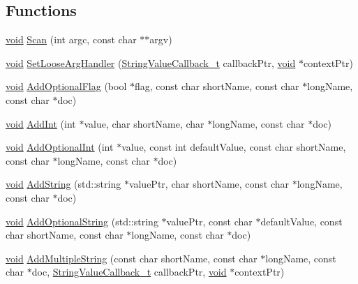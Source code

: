 \subsection*{Functions}
\begin{DoxyCompactItemize}
\item 
\hyperlink{_t_e_m_p_l_a_t_e__cdef_8h_ac9c84fa68bbad002983e35ce3663c686}{void} \hyperlink{namespaceargs_aaa94887be475da49f06e7b539f2ee8b2}{Scan} (int argc, const char $\ast$$\ast$argv)
\item 
\hyperlink{_t_e_m_p_l_a_t_e__cdef_8h_ac9c84fa68bbad002983e35ce3663c686}{void} \hyperlink{namespaceargs_a7a76d0392a64edfae4a1f918ceaebd53}{Set\+Loose\+Arg\+Handler} (\hyperlink{namespaceargs_a80ec8961b6c497068858afd698ac71cb}{String\+Value\+Callback\+\_\+t} callback\+Ptr, \hyperlink{_t_e_m_p_l_a_t_e__cdef_8h_ac9c84fa68bbad002983e35ce3663c686}{void} $\ast$context\+Ptr)
\item 
\hyperlink{_t_e_m_p_l_a_t_e__cdef_8h_ac9c84fa68bbad002983e35ce3663c686}{void} \hyperlink{namespaceargs_ad246cd5717a600f256fe3d3dbb4dcba9}{Add\+Optional\+Flag} (bool $\ast$flag, const char short\+Name, const char $\ast$long\+Name, const char $\ast$doc)
\item 
\hyperlink{_t_e_m_p_l_a_t_e__cdef_8h_ac9c84fa68bbad002983e35ce3663c686}{void} \hyperlink{namespaceargs_a8ce5e23940dc6bd4f3930a3b38d4ead5}{Add\+Int} (int $\ast$value, char short\+Name, char $\ast$long\+Name, const char $\ast$doc)
\item 
\hyperlink{_t_e_m_p_l_a_t_e__cdef_8h_ac9c84fa68bbad002983e35ce3663c686}{void} \hyperlink{namespaceargs_ae5253c9235c9ef665c69a7ab05134625}{Add\+Optional\+Int} (int $\ast$value, const int default\+Value, const char short\+Name, const char $\ast$long\+Name, const char $\ast$doc)
\item 
\hyperlink{_t_e_m_p_l_a_t_e__cdef_8h_ac9c84fa68bbad002983e35ce3663c686}{void} \hyperlink{namespaceargs_a636279358f729c080829ff89179f214c}{Add\+String} (std\+::string $\ast$value\+Ptr, char short\+Name, const char $\ast$long\+Name, const char $\ast$doc)
\item 
\hyperlink{_t_e_m_p_l_a_t_e__cdef_8h_ac9c84fa68bbad002983e35ce3663c686}{void} \hyperlink{namespaceargs_a5a4037678fe472776c6270bbd2f6f827}{Add\+Optional\+String} (std\+::string $\ast$value\+Ptr, const char $\ast$default\+Value, const char short\+Name, const char $\ast$long\+Name, const char $\ast$doc)
\item 
\hyperlink{_t_e_m_p_l_a_t_e__cdef_8h_ac9c84fa68bbad002983e35ce3663c686}{void} \hyperlink{namespaceargs_a3c197cf8b548389b00021f74b02c4491}{Add\+Multiple\+String} (const char short\+Name, const char $\ast$long\+Name, const char $\ast$doc, \hyperlink{namespaceargs_a80ec8961b6c497068858afd698ac71cb}{String\+Value\+Callback\+\_\+t} callback\+Ptr, \hyperlink{_t_e_m_p_l_a_t_e__cdef_8h_ac9c84fa68bbad002983e35ce3663c686}{void} $\ast$context\+Ptr)
$$
\end{DoxyCompactItemize}
